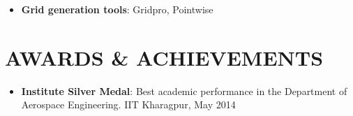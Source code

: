 \documentclass{res}
\begin{document}
\begin{resume}
\begin{itemize}[leftmargin=\parindent]
		\item[] {\bf Grid generation tools}: Gridpro, Pointwise
	\end{itemize}
	
	
	
	
	
	
	
	
	
	
		
	
	\section{\MakeUppercase{Awards \& Achievements}} \vskip 0.35in
	\begin{itemize}[leftmargin=\parindent]
	\setlength{\itemsep}{0mm}
	
		\item[] {\bf Institute Silver Medal}:  Best academic performance in the Department of Aerospace Engineering. IIT Kharagpur, May 2014
	\end{itemize}
	
	
	\end{resume}
	
\end{document}

